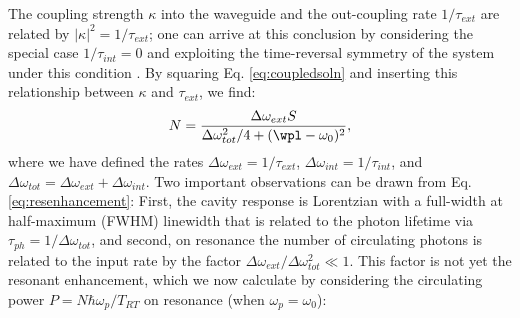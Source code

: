 The coupling strength $\kappa$ into the waveguide and the out-coupling rate $1/\tau_{ext}$ are related by $|\kappa|^2=1/\tau_{ext}$; one can arrive at this conclusion by considering the special case $1/\tau_{int}=0$ and exploiting the time-reversal symmetry of the system under this condition \cite{Haus1984}. By squaring Eq. \ref{eq:coupledsoln} and inserting this relationship between $\kappa$ and $\tau_{ext}$, we find:
% 
   \begin{equation}
   N=\frac{\Delta\omega_{ext}S}{\Delta\omega_{tot}^2/4+(\wpl-\omega_0)^2}, \label{eq:resenhancement}
   \end{equation}
   where we have defined the rates $\Delta\omega_{ext}=1/\tau_{ext}$, $\Delta\omega_{int}=1/\tau_{int}$, and $\Delta\omega_{tot}=\Delta\omega_{ext}+\Delta\omega_{int}$. Two important observations can be drawn from Eq. \ref{eq:resenhancement}: First, the cavity response is Lorentzian with a full-width at half-maximum (FWHM) linewidth that is related to the photon lifetime via $\tau_{ph}=1/\Delta\omega_{tot}$, and second, on resonance the number of circulating photons is related to the input rate by the factor $\Delta\omega_{ext}/\Delta\omega_{tot}^2\ll1$. This factor is not yet the resonant enhancement, which we now calculate by considering the circulating power $P=N\hbar\omega_p/T_{RT}$ on resonance (when $\omega_p=\omega_0$):
